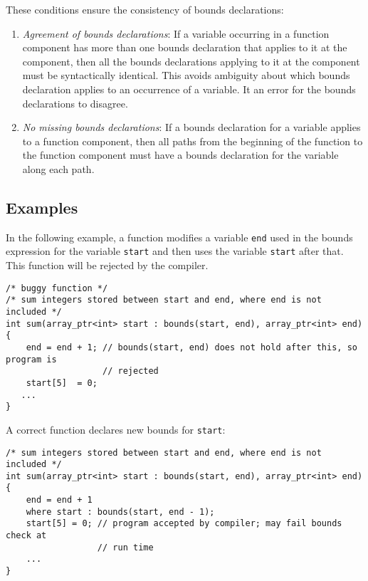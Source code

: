 These conditions ensure the consistency of bounds declarations:

\begin{enumerate}
\item
  \emph{Agreement of bounds declarations}: If a variable occurring in a
  function component has more than one bounds declaration that applies
  to it at the component, then all the bounds declarations applying to
  it at the component must be syntactically identical. This avoids
  ambiguity about which bounds declaration applies to an occurrence of a
  variable. It an error for the bounds declarations to disagree.
\item
  \emph{No missing bounds declarations}: If a bounds declaration for a
  variable applies to a function component, then all paths from the
  beginning of the function to the function component must have a bounds
  declaration for the variable along each path.
\end{enumerate}

\subsection{Examples}
\label{examples:consistency}

In the following example, a function modifies a variable \texttt{end}
used in the bounds expression for the variable \texttt{start} and then
uses the variable \texttt{start} after that. This function will be
rejected by the compiler.

\begin{verbatim}
/* buggy function */
/* sum integers stored between start and end, where end is not included */
int sum(array_ptr<int> start : bounds(start, end), array_ptr<int> end)
{ 
    end = end + 1; // bounds(start, end) does not hold after this, so program is
                   // rejected
    start[5]  = 0;
   ...
}
\end{verbatim}

A correct function declares new bounds for \texttt{start}:

\begin{verbatim}
/* sum integers stored between start and end, where end is not included */
int sum(array_ptr<int> start : bounds(start, end), array_ptr<int> end)
{ 
    end = end + 1
    where start : bounds(start, end - 1);
    start[5] = 0; // program accepted by compiler; may fail bounds check at 
                  // run time
    ...
}
\end{verbatim}

